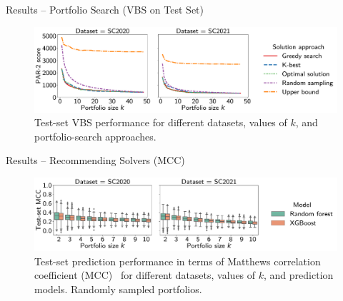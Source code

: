 \documentclass[en]{sdqbeamer}
\begin{document}
\begin{frame}[t]{Results -- Portfolio Search (VBS on Test Set)}
	\begin{figure}[htb]
		\centering
		\includegraphics[width=\textwidth]{plots/search-test-objective.pdf}
		\caption*{Test-set VBS performance for different datasets, values of $k$, and portfolio-search approaches.}
	\end{figure}
\end{frame}

\begin{frame}[t]{Results -- Recommending Solvers (MCC)}
	\begin{figure}[htb]
		\centering
		\includegraphics[width=\textwidth]{plots/prediction-test-mcc.pdf}
		\caption*{Test-set prediction performance in terms of Matthews correlation coefficient (MCC)~\cite{matthews1975comparison,gorodkin2004comparing} for different datasets, values of $k$, and prediction models. Randomly sampled portfolios.}
	\end{figure}
\end{frame}
\end{document}
